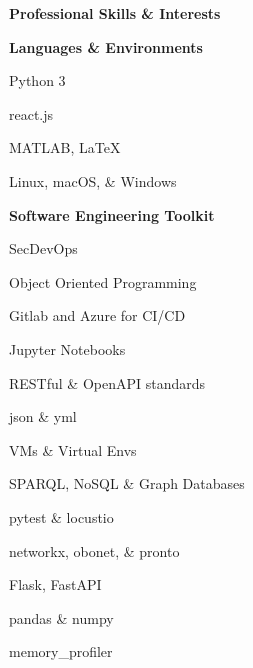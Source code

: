 \documentclass[letterpaper,final]{memoir}
\newcommand{\LargeSep}{\vspace{1.3em}}
\newcommand{\Sep}{\vspace{1.0em}}
\newcommand{\SmallSep}{\vspace{0.4em}}
\newcommand{\CVSection}[1]
	{\LARGE\textbf{#1}\par
	\SmallSep\normalsize}
\newcommand{\CVItem}[1]
	{\textbf{\color{Blue} #1}}
\begin{document}

\notoserif \CVSection{Professional Skills \& Interests}
\normalfont
\LargeSep

\CVItem{Languages \& Environments}
\Sep

\begin{multicols}{1}

    \begin{compactitem}[\color{Blue}$\circ$]

		\item Python 3
        \SmallSep
        \item react.js
        \SmallSep
        \item MATLAB, LaTeX
        \SmallSep
        \item Linux, macOS, \& Windows

	\end{compactitem}

\end{multicols}

\Sep

\CVItem{Software Engineering Toolkit}
\Sep

\begin{multicols}{2}

    \begin{compactitem}[\color{Blue}$\circ$]

        \item SecDevOps
        \SmallSep
        \item Object Oriented Programming
        \SmallSep
        \item Gitlab and Azure for CI/CD
        \SmallSep
        \item Jupyter Notebooks
        \SmallSep
        \item RESTful \& OpenAPI standards
		\SmallSep
        \item json \& yml
        \SmallSep
        \item VMs \& Virtual Envs
        \SmallSep
        \item SPARQL, NoSQL \& Graph Databases
        \SmallSep
        \item pytest \& locustio
        \SmallSep
        \item networkx, obonet, \& pronto
        \SmallSep
        \item Flask, FastAPI
        \SmallSep
        \item pandas \& numpy
        \SmallSep
        \item memory\_profiler
        \SmallSep

    \end{compactitem}

\end{multicols}
\LargeSep
\end{document}
